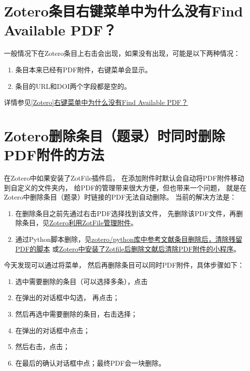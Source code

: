 \documentclass[cn,11pt,chinese]{elegantbook}
\begin{document}
	\section{Zotero条目右键菜单中为什么没有Find Available PDF？}\label{sec:Find_PDF}	
				一般情况下在Zotero条目上右击会出现，如果没有出现，可能是以下两种情况：
				\begin{enumerate}
					\item 条目本来已经有PDF附件，右键菜单会显示。
					\item 条目的URL和DOI两个字段都是空的。
				\end{enumerate}
				详情参见\href{https://zhuanlan.zhihu.com/p/348697024}
							{[Zotero]右键菜单中为什么没有Find Available PDF？}
	
	\section{Zotero删除条目（题录）时同时删除PDF附件的方法}\label{sec:Delete_attach}						
			在Zotero中如果安装了ZotFile插件后，
			在添加附件时默认会自动将PDF附件移动到自定义的文件夹内，
			给PDF的管理带来很大方便，但也带来一个问题，
			就是在Zotero中删除条目（题录）时链接的PDF无法自动删除。
			当前的解决方法是：
			\begin{enumerate}
				\item 在删除条目之前先通过右击PDF选择找到该文件，
				先删除该PDF文件，再删除条目，见\href{https://zhuanlan.zhihu.com/p/337801423}
			{Zotero利用ZotFile管理附件}。
				\item 通过Python脚本删除，见\href{https://zhuanlan.zhihu.com/p/121770068}
				{zotero/python库中参考文献条目删除后，清除残留PDF的脚本}
				或\href{https://zhuanlan.zhihu.com/p/109531298}
				{Zotero中安装了Zotfile后删除文献后清除PDF附件的小程序}。
			\end{enumerate}
			
			今天发现可以通过将菜单，
			然后再删除条目可以同时PDF附件，具体步骤如下：
			\begin{enumerate}
				\item 选中需要删除的条目（可以选择多条），点击
				\item 在弹出的对话框中勾选，
					再点击；
				\item 然后再选中需要删除的条目，右击选择；
				\item 在弹出的对话框中点击；
				\item 然后右击，点击；
				\item 在最后的确认对话框中点；最终PDF会一块删除。
				\end{enumerate}
			 
\end{document}
